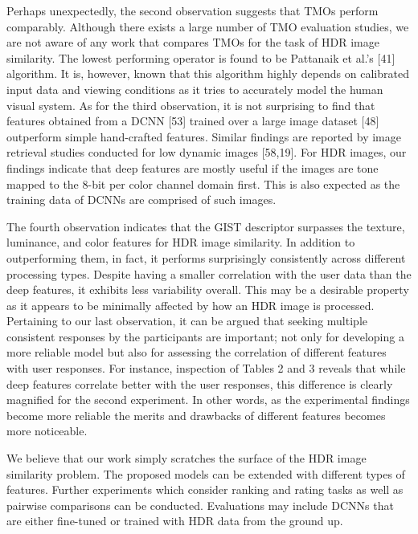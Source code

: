 Perhaps unexpectedly, the second observation suggests that TMOs perform comparably. Although there exists a large number of TMO evaluation studies, we are not aware of any work that compares TMOs for the task of HDR image similarity. The lowest performing operator is found to be Pattanaik et al.’s [41] algorithm. It is, however, known that this algorithm highly depends on calibrated input data and viewing conditions as it tries to accurately model the human visual system.
As for the third observation, it is not surprising to find that features obtained from a DCNN [53] trained over a large image dataset [48] outperform simple hand-crafted features. Similar findings are reported by image retrieval studies conducted for low dynamic images [58,19]. For HDR images, our findings indicate that deep features are mostly useful if the images are tone mapped to the 8-bit per color channel domain first. This is also expected as the training data of DCNNs are comprised
of such images.

The fourth observation indicates that the GIST descriptor surpasses the texture, luminance, and color features for HDR image similarity. In addition to outperforming them, in fact, it performs surprisingly consistently across different processing types. Despite having a smaller correlation with the user data than the deep features, it exhibits less variability overall. This may be a desirable property as it appears to be minimally affected by how an HDR image is processed.
Pertaining to our last observation, it can be argued that seeking multiple consistent responses by the participants are important; not only for developing a more reliable model but also for assessing the correlation of different features with user responses. For instance, inspection of Tables 2 and 3 reveals that while deep features correlate better with the user responses, this difference is clearly magnified for the second experiment. In other words, as the experimental findings become more reliable the merits and drawbacks of different features becomes more noticeable.

We believe that our work simply scratches the surface of the HDR image similarity problem. The proposed models can be extended with different types of features. Further experiments which consider ranking and rating tasks as well as pairwise comparisons can be conducted. Evaluations may include DCNNs that are either fine-tuned or trained with HDR data from the ground up.